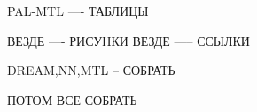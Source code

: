 PAL-MTL ---- ТАБЛИЦЫ

ВЕЗДЕ ---- РИСУНКИ
ВЕЗДЕ ----- ССЫЛКИ

DREAM,NN,MTL -- СОБРАТЬ

ПОТОМ ВСЕ СОБРАТЬ